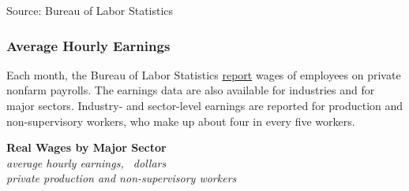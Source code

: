 \documentclass{report}
\makeatletter
\newcommand{\tbllink}[1]{\href{https://raw.githubusercontent.com/bdecon/US-chartbook/master/chartbook/data/#1}{\faTable}}
\newcommand*\short[1]{\expandafter\@gobbletwo\number\numexpr#1\relax}
\newcommand{\absnode}[3]{\node[below right, align=left] at (axis cs: #1,#2) {#3};}
\newcommand{\shdateaxisticks}{
		date coordinates in=x, axis line style={draw=none},
		xmax={2023-11-30},
		max space between ticks=40,	    
		xtick={{1990-01-01}, {1995-01-01}, {2000-01-01}, 
			{2005-01-01}, {2010-01-01}, {2015-01-01}, {2020-01-01}},
		minor xtick={},
		enlarge y limits={0.06}, enlarge x limits={0.01},
		xticklabel style={align=center, yshift=-2pt}, tick label style={inner sep=0pt},
		}
\newcommand{\stdline}[4]{\addplot[very thick, no markers, color=#1] 
		table [x=#2, y=#3, col sep=comma] {#4};	}
\newcommand{\thickline}[4]{\addplot[ultra thick, no markers, color=#1] 
		table [x=#2, y=#3, col sep=comma] {#4};	}
\newcommand{\rbars}{
		\fill[color=black!10] (axis cs:{1990-07-01},\pgfkeysvalueof{/pgfplots/ymin}) rectangle 
			(axis cs:{1991-03-01}, \pgfkeysvalueof{/pgfplots/ymax});
		\fill[color=black!10] (axis cs:{2007-12-01},\pgfkeysvalueof{/pgfplots/ymin}) rectangle 
			(axis cs:{2009-07-01}, \pgfkeysvalueof{/pgfplots/ymax});
		\fill[color=black!10] (axis cs:{2001-03-01},\pgfkeysvalueof{/pgfplots/ymin}) rectangle 
			(axis cs:{2001-11-01}, \pgfkeysvalueof{/pgfplots/ymax});
		\fill[color=black!10] (axis cs:{2020-02-01},\pgfkeysvalueof{/pgfplots/ymin}) rectangle 
			(axis cs:{2020-05-01}, \pgfkeysvalueof{/pgfplots/ymax});}
\makeatother
\begin{document}
{\begin{minipage}{0.45\textwidth}
\footnotesize{Source: Bureau of Labor Statistics} \hfill \tbllink{gwg.csv}
\end{minipage} \hspace{5mm} \begin{minipage}{0.27\textwidth}
\small 
\end{minipage}
\newpage
\begin{minipage}{0.76\textwidth}  
\subsubsection*{Average Hourly Earnings}
\small Each month, the Bureau of Labor Statistics \href{https://www.bls.gov/news.release/empsit.nr0.htm}{report} wages of employees on private nonfarm payrolls. The earnings data are also available for industries and for major sectors. Industry- and sector-level earnings are reported for production and non-supervisory workers, who make up about four in every five workers. 
\end{minipage}
\vspace{1mm}

\begin{minipage}{0.4\textwidth}
\normalsize \textbf{Real Wages by Major Sector}\\
\footnotesize{\textit{average hourly earnings, \unskip \ dollars}}\\
\footnotesize{\textit{private production and non-supervisory workers}}
\vspace{3.1cm}

\hspace{2mm} 


\end{minipage}}
\end{document}
